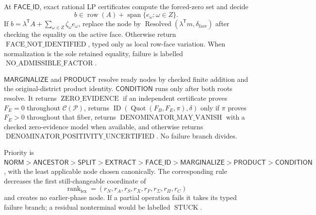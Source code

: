 At \(\mathsf{FACE\_ID}\), exact rational LP certificates compute the forced-zero set and decide
\[
b\in\operatorname{row}(A)+\operatorname{span}\{e_\omega:\omega\in Z\}.
\]
If \(b=\lambda^{\mathsf T}A+\sum_{\omega\in Z}\zeta_\omega e_\omega\), replace the node by \(\operatorname{Resolved}(\lambda^{\mathsf T}m,\delta_{\mathrm{face}})\) after checking the equality on the active face.  Otherwise return \(\operatorname{FACE\_NOT\_IDENTIFIED}\), typed only as local row-face variation.  When normalization is the sole retained equality, failure is labelled \(\operatorname{NO\_ADMISSIBLE\_FACTOR}\).

\(\mathsf{MARGINALIZE}\) and \(\mathsf{PRODUCT}\) resolve ready nodes by checked finite addition and the original-district product identity.  \(\mathsf{CONDITION}\) runs only after both roots resolve.  It returns \(\operatorname{ZERO\_EVIDENCE}\) if an independent certificate proves \(F_E=0\) throughout \(\mathcal C(\mathcal P)\), returns \(\operatorname{ID}(\operatorname{Quot}(F_B,F_E,\pi),\delta)\) only if \(\pi\) proves \(F_E>0\) throughout that fiber, returns \(\operatorname{DENOMINATOR\_MAY\_VANISH}\) with a checked zero-evidence model when available, and otherwise returns \(\operatorname{DENOMINATOR\_POSITIVITY\_UNCERTIFIED}\).  No failure branch divides.

Priority is \(\mathsf{NORM}>\mathsf{ANCESTOR}>\mathsf{SPLIT}>\mathsf{EXTRACT}>\mathsf{FACE\_ID}>\mathsf{MARGINALIZE}>\mathsf{PRODUCT}>\mathsf{CONDITION}\), with the least applicable node chosen canonically.  The corresponding rule decreases the first still-changeable coordinate of
\[
\operatorname{rank}_{\mathrm{lex}}=(r_N,r_A,r_S,r_X,r_F,r_\Sigma,r_\Pi,r_C)
\]
and creates no earlier-phase node.  If a partial operation fails it takes its typed failure branch; a residual nonterminal would be labelled \(\operatorname{STUCK}\).